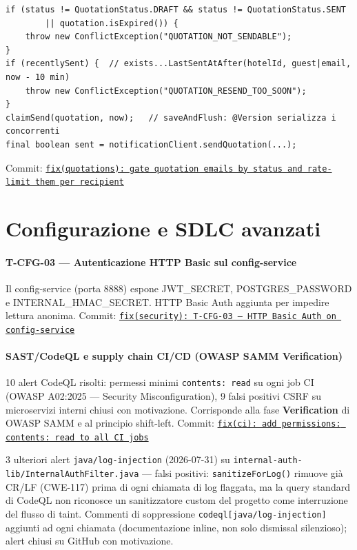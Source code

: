 ﻿\documentclass[a4paper,12pt]{report}
\newcommand{\commitref}[2]{\texttt{\small \href{https://github.com/diegoandruccioli/hotel-pms/commit/#1}{#2}}}
\begin{document}
\begin{securebox}[title={QuotationServiceImpl.java --- gate di stato e cooldown per destinatario (main)}]
\begin{lstlisting}[style=java]
if (status != QuotationStatus.DRAFT && status != QuotationStatus.SENT
        || quotation.isExpired()) {
    throw new ConflictException("QUOTATION_NOT_SENDABLE");
}
if (recentlySent) {  // exists...LastSentAtAfter(hotelId, guest|email, now - 10 min)
    throw new ConflictException("QUOTATION_RESEND_TOO_SOON");
}
claimSend(quotation, now);   // saveAndFlush: @Version serializza i concorrenti
final boolean sent = notificationClient.sendQuotation(...);
\end{lstlisting}
\end{securebox}

Commit: \commitref{fcbe14e6}{fix(quotations): gate quotation emails by status and rate-limit them per recipient}

\section{Configurazione e SDLC avanzati}

\paragraph{T-CFG-03 --- Autenticazione HTTP Basic sul config-service}
Il config-service (porta 8888) espone JWT\_SECRET, POSTGRES\_PASSWORD e
INTERNAL\_HMAC\_SECRET. HTTP Basic Auth aggiunta per impedire lettura anonima.
Commit: \commitref{c934f6e}{fix(security): T-CFG-03 --- HTTP Basic Auth on config-service}

\paragraph{SAST/CodeQL e supply chain CI/CD (OWASP SAMM Verification)}
10 alert CodeQL risolti: permessi minimi \texttt{contents: read} su ogni job CI
(OWASP A02:2025 --- Security Misconfiguration), 9 falsi positivi CSRF su microservizi interni chiusi con motivazione.
Corrisponde alla fase \textbf{Verification} di OWASP SAMM e al principio shift-left.
Commit: \commitref{92c0050}{fix(ci): add permissions: contents: read to all CI jobs}

3 ulteriori alert \texttt{java/log-injection} (2026-07-31) su
\texttt{internal-auth-lib/InternalAuthFilter.java} --- falsi positivi:
\texttt{sanitizeForLog()} rimuove già CR/LF (CWE-117) prima di ogni chiamata di
log flaggata, ma la query standard di CodeQL non riconosce un sanitizzatore
custom del progetto come interruzione del flusso di taint. Commenti di
soppressione \texttt{codeql[java/log-injection]} aggiunti ad ogni chiamata
(documentazione inline, non solo dismissal silenzioso); alert chiusi su GitHub
con motivazione.
\end{document}
